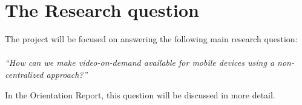 \section{The Research question}
The project will be focused on answering the following main research question:\\
\\
\textit{``How can we make video-on-demand available for mobile devices using a non-centralized approach?''}

In the Orientation Report, this question will be discussed in more detail.